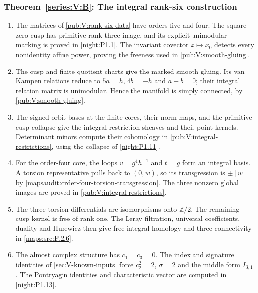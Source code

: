 \documentclass[11pt,a4paper]{article}
\numberwithin{equation}{section}
\theoremstyle{definition}
\begin{document}
\subsubsection*{Theorem~\ref{series:V:B}: The integral rank-six construction}
\begin{enumerate}[label=\arabic*.,leftmargin=*]
\item\hypertarget{step-V-B-1}{} The matrices of \cref{pub:V:rank-six-data} have orders five and four. The square-zero cusp has primitive rank-three image, and its explicit unimodular marking is proved in \cref{night:P1.1}. The invariant covector $x\mapsto x_0$ detects every nonidentity affine power, proving the freeness used in \cref{pub:V:smooth-gluing}.

\item\hypertarget{step-V-B-2}{} The cusp and finite quotient charts give the marked smooth gluing. Its van Kampen relations reduce to $5a=h$, $4b=-h$ and $a+b=0$; their integral relation matrix is unimodular. Hence the manifold is simply connected, by \cref{pub:V:smooth-gluing}.

\item\hypertarget{step-V-B-3}{} The signed-orbit bases at the finite cores, their norm maps, and the primitive cusp collapse give the integral restriction sheaves and their point kernels. Determinant minors compute their cohomology in \cref{pub:V:integral-restrictions}, using the collapse of \cref{night:P1.11}.

\item\hypertarget{step-V-B-4}{} For the order-four core, the loops $v=g^4h^{-1}$ and $t=g$ form an integral basis. A torsion representative pulls back to $(0,w)$, so its transgression is $\pm[w]$ by \cref{mapsaudit:order-four-torsion-transgression}. The three nonzero global images are proved in \cref{pub:V:integral-restrictions}.

\item\hypertarget{step-V-B-5}{} The three torsion differentials are isomorphisms onto $\mathbb Z/2$. The remaining cusp kernel is free of rank one. The Leray filtration, universal coefficients, duality and Hurewicz then give free integral homology and three-connectivity in \cref{maps:src:F.2.6}.

\item\hypertarget{step-V-B-6}{} The almost complex structure has $c_1=c_3=0$. The index and signature identities of \cref{sec:V-known-inputs} force $c_2^2=2$, $\sigma=2$ and the middle form $I_{3,1}$. The Pontryagin identities and characteristic vector are computed in \cref{night:P1.13}.

\end{enumerate}
\end{document}
